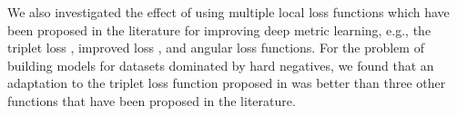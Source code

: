 We also investigated the effect of using multiple local loss functions which have been proposed in the literature for improving deep metric learning, e.g., the triplet loss \cite{DBLP:conf/cvpr/SchroffKP15}, improved loss \cite{Zhang:2016:DML:3088616.3088665}, and angular loss \cite{DBLP:journals/corr/abs-1708-01682} functions.  For the problem of building models for datasets dominated by hard negatives, we found that an adaptation to the triplet loss function proposed in \cite{DBLP:conf/cvpr/SchroffKP15} was better than three other functions that have been proposed in the literature. 
%


